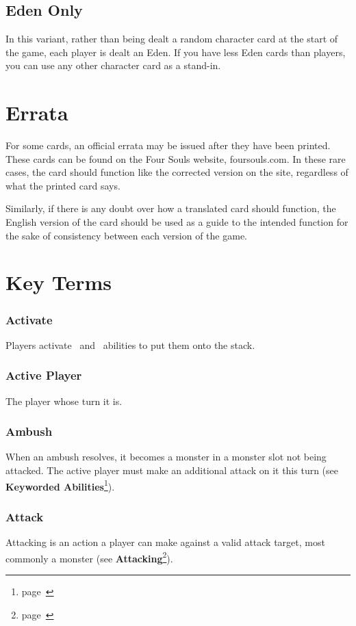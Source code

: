 \documentclass[
  fontsize=10pt,
  paper=a5,
  version=last,
  chapterprefix=true,
  bindingoffset=5mm,
  ]{scrbook}
\newcommand*{\inlineicon}[1]{%
    \raisebox{-.3\baselineskip}{%
        \smash{%
            \texttt{[image: \#1]}%
        }%
    }%
}
\newcommand{\tap}{\inlineicon{./assets/ms-tap.png}}
\newcommand{\pay}{\inlineicon{./assets/ms-paid.png}}
\begin{document}
    \section{Eden Only}
    In this variant, rather than being dealt a random character card at the start of the game, each player is dealt an Eden. If you have less Eden cards than players, you can use any other character card as a stand-in.
    \chapter{Errata}
    For some cards, an official errata may be issued after they have been printed. These cards can be found on the Four Souls website, foursouls.com. In these rare cases, the card should function like the corrected version on the site, regardless of what the printed card says.
    
    Similarly, if there is any doubt over how a translated card should function, the English version of the card should be used as a guide to the intended function for the sake of consistency between each version of the game.

    \chapter{Key Terms}
    \subsection*{Activate}
    Players activate \tap\ and \pay\ abilities to put them onto the stack.
    \subsection*{Active Player}
    The player whose turn it is.
    \subsection*{Ambush}
    When an ambush resolves, it becomes a monster in a monster slot not being attacked. The active player must make an additional attack on it this turn (see \textbf{Keyworded Abilities}\footnote{page~\pageref{keyworded}}).
    \subsection*{Attack}
    Attacking is an action a player can make against a valid attack target, most commonly a monster (see \textbf{Attacking}\footnote{page~\pageref{attacking}}).
\end{document}
